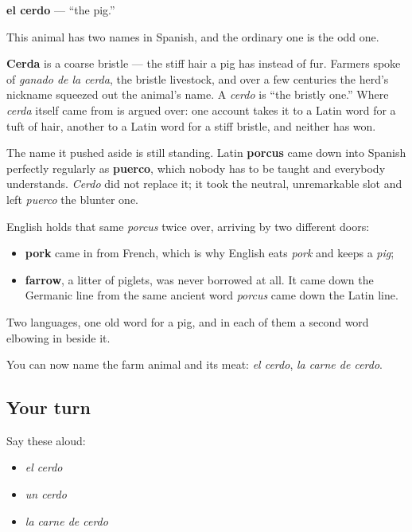 \begin{cousinweb}
\textbf{el cerdo} — \textquotedblleft{}the pig.\textquotedblright{}

This animal has two names in Spanish, and the ordinary one is the odd one.

\textbf{Cerda} is a coarse bristle — the stiff hair a pig has instead of fur. Farmers spoke of \emph{ganado de la cerda}, the bristle livestock, and over a few centuries the herd's nickname squeezed out the animal's name. A \emph{cerdo} is \textquotedblleft{}the bristly one.\textquotedblright{} Where \emph{cerda} itself came from is argued over: one account takes it to a Latin word for a tuft of hair, another to a Latin word for a stiff bristle, and neither has won.

The name it pushed aside is still standing. Latin \textbf{porcus} came down into Spanish perfectly regularly as \textbf{puerco}, which nobody has to be taught and everybody understands. \emph{Cerdo} did not replace it; it took the neutral, unremarkable slot and left \emph{puerco} the blunter one.

English holds that same \emph{porcus} twice over, arriving by two different doors:

\begin{itemize}
\raggedright
  \item \textbf{pork} came in from French, which is why English eats \emph{pork} and keeps a \emph{pig};
  \item \textbf{farrow}, a litter of piglets, was never borrowed at all. It came down the Germanic line from the same ancient word \emph{porcus} came down the Latin line.
\end{itemize}

Two languages, one old word for a pig, and in each of them a second word elbowing in beside it.
\end{cousinweb}

\begin{grammarlens}[title={What you've built}]
You can now name the farm animal and its meat: \emph{el cerdo}, \emph{la carne de cerdo}.
\end{grammarlens}

\subsection*{Your turn}
Say these aloud:

\begin{itemize}
\raggedright
  \item \emph{el cerdo}
  \item \emph{un cerdo}
  \item \emph{la carne de cerdo}
\end{itemize}

